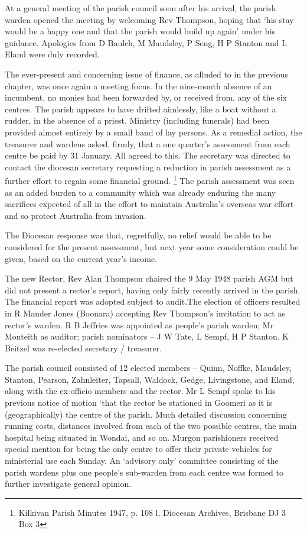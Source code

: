 At a general meeting of the parish council soon after his arrival, the parish warden opened the meeting by welcoming Rev Thompson, hoping that `his stay would be a happy one and that the parish would build up again' under his guidance. Apologies from D Baulch, M Maudsley, P Seng, H P Stanton and L Eland were duly recorded.



The ever-present and concerning issue of finance, as alluded to in the previous chapter, was once again a meeting focus. In the nine-month absence of an incumbent, no monies had been forwarded by, or received from, any of the six centres. The parish appears to have drifted aimlessly, like a boat without a rudder, in the absence of a priest. Ministry (including funerals) had been provided almost entirely by a small band of lay persons. As a remedial action, the treasurer and wardens asked, firmly, that a one quarter's assessment from each centre be paid by 31 January. All agreed to this. The secretary was directed to contact the diocesan secretary requesting a reduction in parish assessment as a further effort to regain some financial ground. \footnote{Kilkivan Parish Minutes 1947, p. 108 l, Diocesan Archives, Brisbane DJ 3 Box 3} The parish assessment was seen as an added burden to a community which was already enduring the many sacrifices expected of all in the effort to maintain Australia's overseas war effort and so protect Australia from invasion.


The Diocesan response was that, regretfully, no relief would be able to be considered for the present assessment, but next year some consideration could be given, based on the current year's income.



The new Rector, Rev Alan Thompson chaired the 9 May 1948 parish AGM but did not present a rector's report, having only fairly recently arrived in the parish. The financial report was adopted subject to audit.The election of officers resulted in R Mander Jones (Boonara) accepting Rev Thompson's invitation to act as rector's warden. R B Jeffries was appointed as people's parish warden; Mr Monteith as auditor; parish nominators -- J W Tate, L Sempf, H P Stanton. K Beitzel was re-elected secretary / treasurer.



The parish council consisted of 12 elected members -- Quinn, Noffke, Maudsley, Stanton, Pearson, Zahnleiter, Tapsall, Waldock, Gedge, Livingstone, and Eland, along with the ex-officio members and the rector. Mr L Sempf spoke to his previous notice of motion `that the rector be stationed in Goomeri as it is (geographically) the centre of the parish. Much detailed discussion concerning running costs, distances involved from each of the two possible centres, the main hospital being situated in Wondai, and so on. Murgon parishioners received special mention for being the only centre to offer their private vehicles for ministerial use each Sunday. An `advisory only' committee consisting of the parish wardens plus one people's sub-warden from each centre was formed to further investigate general opinion.



